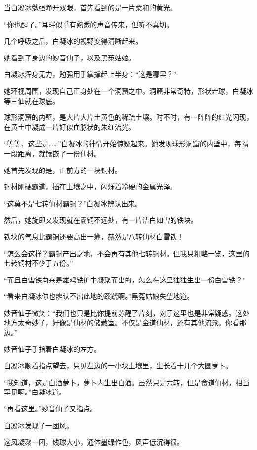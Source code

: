 
\begin{this_body}

当白凝冰勉强睁开双眼，首先看到的是一片柔和的黄光。

“你也醒了。”耳畔似乎有熟悉的声音传来，但听不真切。

几个呼吸之后，白凝冰的视野变得清晰起来。

她看到了身边的妙音仙子，以及黑菟姑娘。

白凝冰浑身无力，勉强用手掌撑起上半身：“这是哪里？”

她环视周围，发现自己正身处在一个洞窟之中。洞窟非常奇特，形状若球，白凝冰等三仙就在球底。

球形洞窟的内壁，是大片大片土黄色的稀疏土壤。时不时，有一阵阵的红光闪现，在黄土中凝成一片好似血脉状的朱红流光。

“等等，这些是……”白凝冰的神情开始惊疑起来。她发现球形洞窟的内壁中，每隔一段距离，就镶嵌了一份仙材。

她首先发现的是，正前方的一块铜材。

铜材刚硬霸道，插在土壤之中，闪烁着冷硬的金属光泽。

“这莫不是七转仙材霸铜？”白凝冰辨认出来。

然后，她旋即又发现就在霸铜不远处，有一片洁白如雪的铁块。

铁块的气息比霸铜还要高出一筹，赫然是八转仙材白雪铁！

“怎么会这样？霸铜产出之地，不会再有其他七转铜材。但我只粗略一览，这里的七转铜材不少于五份。”

“而且白雪铁向来是雄鸡铁矿中凝聚而出的，怎么在这里独独生出一份白雪铁？”

“看来白凝冰你也辨认不出此地的蹊跷啊。”黑菟姑娘失望地道。

妙音仙子微笑：“我们也只是比你提前苏醒了片刻，对于这里也是非常疑惑。这处地方太奇妙了，好像是仙材的储藏室。不仅是金道仙材，还有其他流派。你看那边。”

妙音仙子手指着白凝冰的左方。

白凝冰顺着指点望去，只见左边的一小块土壤里，生长着十几个大圆萝卜。

“我知道，这是白酒萝卜，萝卜内生出白酒。虽然只是六转，但是食道仙材，相当罕见啊。”白凝冰道。

“再看这里。”妙音仙子又指点。

白凝冰发现了一团风。

这风凝聚一团，线球大小，通体墨绿作色，风声低沉得很。


\end{this_body}
